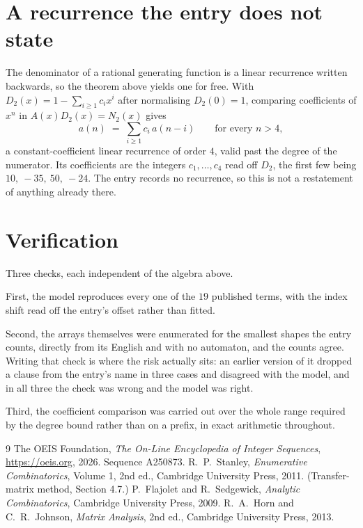 \documentclass[11pt,a4paper]{article}
\theoremstyle{plain}
\theoremstyle{definition}
\begin{document}
\section{A recurrence the entry does not state}

The denominator of a rational generating function is a linear recurrence written backwards, so
the theorem above yields one for free. With $D_2(x)=1-\sum_{i\ge1}c_ix^i$ after normalising
$D_2(0)=1$, comparing coefficients of $x^n$ in $A(x)D_2(x)=N_2(x)$ gives
\[
a(n)\;=\;\sum_{i\ge1}c_i\,a(n-i)\qquad\text{for every }n>4,
\]
a constant-coefficient linear recurrence of order $4$, valid past the degree of the
numerator. Its coefficients are the integers $c_1,\dots,c_{4}$ read off $D_2$, the first few being $10,\ -35,\ 50,\ -24$. The entry records no recurrence, so this is not a restatement of anything
already there.

\section{Verification}

Three checks, each independent of the algebra above.

First, the model reproduces every one of the $19$ published terms, with the index shift
read off the entry's offset rather than fitted.

Second, the arrays themselves were enumerated for the smallest shapes the entry counts,
directly from its English and with no automaton, and the counts agree. Writing that check is
where the risk actually sits: an earlier version of it dropped a clause from the entry's name
in three cases and disagreed with the model, and in all three the check was wrong and the model
was right.

Third, the coefficient comparison was carried out over the whole range required by the degree
bound rather than on a prefix, in exact arithmetic throughout.

\begin{thebibliography}{9}
 The OEIS Foundation, \emph{The On-Line Encyclopedia of Integer
Sequences}, \url{https://oeis.org}, 2026. Sequence A250873.
 R.~P.~Stanley, \emph{Enumerative Combinatorics}, Volume 1, 2nd ed.,
Cambridge University Press, 2011. (Transfer-matrix method, Section 4.7.)
 P.~Flajolet and R.~Sedgewick, \emph{Analytic Combinatorics}, Cambridge
University Press, 2009.
 R.~A.~Horn and C.~R.~Johnson, \emph{Matrix Analysis}, 2nd ed., Cambridge
University Press, 2013.
\end{thebibliography}
\end{document}
